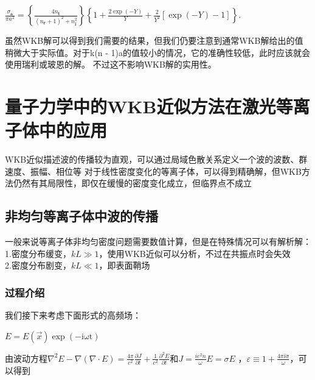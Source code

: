 \documentclass[12pt]{article}
\begin{document}
\begin{center}
    $\displaystyle\frac{\sigma_\mathbf a}{\pi a^2}=\left\{\frac{4n_\mathbf t}{(n_\mathbf r+1)^2+n_\mathbf i^2}\right\}\left\{1+\frac{2\exp(-Y)}{Y}+\frac{2}{Y^2}\left[\exp(-Y)-1\right]\right\}.$
\end{center}

虽然WKB解可以得到我们需要的结果，但我们仍要注意到通常WKB解给出的值稍微大于实际值\cite{5472149}。对于k(n - 1)a的值较小的情况，它的准确性较低，此时应该就会使用瑞利或玻恩的解。
不过这不影响WKB解的实用性。


\section{量子力学中的WKB近似方法在激光等离子体中的应用}
WKB近似描述波的传播较为直观，可以通过局域色散关系定义一个波的波数、群速度、振幅、相位等
对于线性密度变化的等离子体，可以得到精确解，但WKB方法仍然有其局限性，即仅在缓慢的密度变化成立，但临界点不成立
\subsection{非均匀等离子体中波的传播}
一般来说等离子体非均匀密度问题需要数值计算，但是在特殊情况可以有解析解：
1.密度分布缓变，$kL\gg 1$，使用WKB近似可以分析，不过在共振点时会失效\cite{lasertextbook11223}
\\
2.密度分布剧变，$kL\ll 1$，即表面鞘场
\subsubsection{过程介绍}
我们接下来考虑下面形式的高频场：
\begin{center}
    $\displaystyle E = E(\vec{x})\exp (-\mathrm{i\omega t})$
\end{center}
由波动方程$\displaystyle \nabla^{2}E-\nabla(\nabla\cdot E)=\frac{4\pi}{c^{2}}\frac{\partial J}{\partial t}+\frac{1}{c^{2}}\frac{\partial^{2}E}{\partial t}$和$\displaystyle J = \frac{ie^2n}{\omega}E = \sigma E$
，$\displaystyle \varepsilon\equiv 1+\frac{4\pi i \sigma}{\omega}$，可以得到
\end{document}
